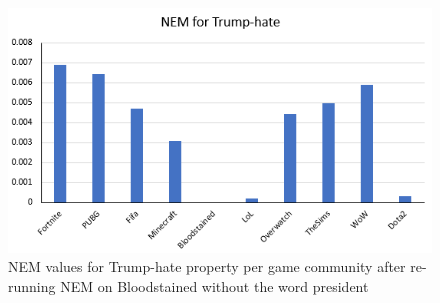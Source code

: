 \begin{figure}[ht]
    \begin{center}
        \includegraphics[scale=0.46]{Images/nem-trump2.PNG}
    \end{center}
    \caption{NEM values for Trump-hate property per game community after re-running NEM on Bloodstained without the word president}
    \label{fig:nem-trump2}
\end{figure}